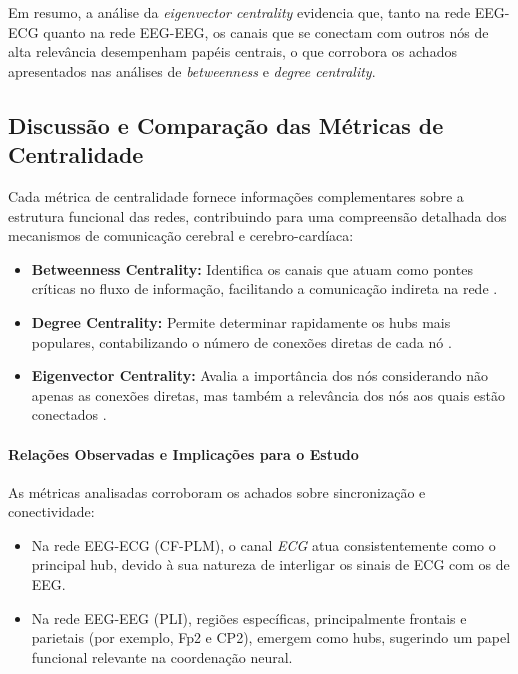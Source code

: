 Em resumo, a análise da \emph{eigenvector centrality} evidencia que, tanto na rede EEG-ECG quanto na rede EEG-EEG, os canais que se conectam com outros nós de alta relevância desempenham papéis centrais, o que corrobora os achados apresentados nas análises de \emph{betweenness} e \emph{degree centrality}.

\subsection{Discussão e Comparação das Métricas de Centralidade}
\label{subsec:discuss_centrality_metrics}

Cada métrica de centralidade fornece informações complementares sobre a estrutura funcional das redes, contribuindo para uma compreensão detalhada dos mecanismos de comunicação cerebral e cerebro-cardíaca:

\begin{itemize}
    \item \textbf{Betweenness Centrality:} Identifica os canais que atuam como pontes críticas no fluxo de informação, facilitando a comunicação indireta na rede \cite{freeman1977set}.
    \item \textbf{Degree Centrality:} Permite determinar rapidamente os hubs mais populares, contabilizando o número de conexões diretas de cada nó \cite{newman2010networks}.
    \item \textbf{Eigenvector Centrality:} Avalia a importância dos nós considerando não apenas as conexões diretas, mas também a relevância dos nós aos quais estão conectados \cite{bonacich1972factoring}.
\end{itemize}

\paragraph{Relações Observadas e Implicações para o Estudo}  
As métricas analisadas corroboram os achados sobre sincronização e conectividade:
\begin{itemize}
    \item Na rede EEG-ECG (CF-PLM), o canal \emph{ECG} atua consistentemente como o principal hub, devido à sua natureza de interligar os sinais de ECG com os de EEG.
    \item Na rede EEG-EEG (PLI), regiões específicas, principalmente frontais e parietais (por exemplo, Fp2 e CP2), emergem como hubs, sugerindo um papel funcional relevante na coordenação neural.
\end{itemize}

